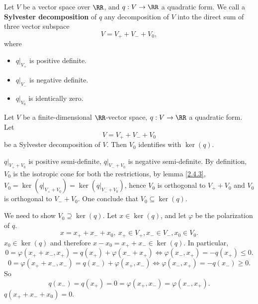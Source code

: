 \begin{definitionenv}
    Let $V$ be a vector space over $\RR$, and $q: V\rightarrow \RR$ a quadratic form.
    We call a \textbf{Sylvester decomposition} of $q$ any decomposition of $V$ into the direct sum of three vector subspace
    $$ V = V_+ + V_- +V_0,$$
    where
    \begin{itemize}
        \item $q|_{V_+}$ is positive definite.
        \item $q|_{V_-}$ is negative definite.
        \item $q|_{V_0}$ is identically zero.
    \end{itemize}
\end{definitionenv}
\begin{propositionenv}
    Let $V$ be a finite-dimensional $\RR$-vector space, $q: V\rightarrow \RR$ a quadratic form.
    Let 
    $$ V = V_+ + V_- + V_0$$
    be a Sylvester decomposition of $V$. Then $V_0$ identifies with $\ker(q)$.
\end{propositionenv}
\begin{proofenv}
    $q|_{V_+ + V_0}$ is positive semi-definite, $q|_{V_- + V_0}$ is negative semi-definite.
    By definition, $V_0$ is the isotropic cone for both the restrictions, by lemma \ref{2.4.3}, $V_0 = \ker \left(q|_{V_+ + V_0}\right) = \ker\left(q|_{V_-+V_0}\right)$, hence $V_0$ is orthogonal to $V_+ + V_0$ and $V_0$ is orthogonal to $V_- + V_0$.
    One conclude that $V_0\subseteq \ker (q)$.

    \quad We need to show $V_0 \supseteq \ker(q)$.
    Let $x \in \ker(q)$, and let $\varphi$ be the polarization of $q$.
    $$ x = x_+ +x_- + x_0,\ x_+ \in V_+, x_- \in V_-, x_0\in V_0.$$
    $x_0 \in \ker(q)$ and therefore $x - x_0 = x_+ + x_- \in \ker(q)$.
    In particular,
    $$ 0 = \varphi(x_+ +x_- ,x_+) = q(x_+) + \varphi(x_- + x_+) \Leftrightarrow \varphi (x_-,x_+) = -q(x_+) \le 0.$$
    $$ 0 = \varphi(x_+ + x_-,x_-) = q(x_-) + \varphi(x_+,x_-) \Leftrightarrow \varphi(x_-, x_+) = -q(x_-) \ge 0.$$
    So 
    $$ q(x_-) = q(x_+)= 0 =\varphi(x_+,x_-) = \varphi(x_-,x_+).$$
    $q(x_+ +x_- +x_0) = 0.$
\end{proofenv}


